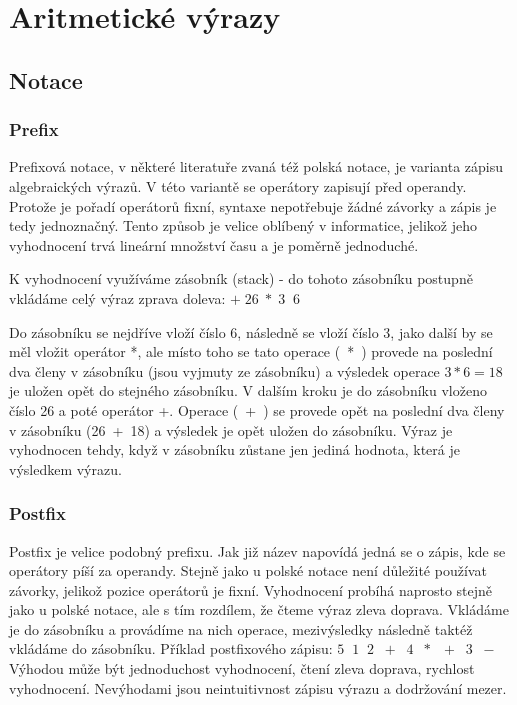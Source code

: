 \documentclass[12pt,a4paper]{report}
\begin{document}
\newpage 
\chapter{Aritmetické výrazy}            
\section{Notace}
\subsection{Prefix}
Prefixová notace, v některé literatuře zvaná též polská notace, je varianta zápisu algebraických výrazů. V této variantě se operátory zapisují před operandy. Protože je pořadí operátorů fixní, syntaxe nepotřebuje žádné závorky a zápis je tedy jednoznačný. \cite{prefix}
Tento způsob je velice oblíbený v informatice, jelikož jeho vyhodnocení trvá lineární množství času a je poměrně jednoduché. 


K vyhodnocení využíváme zásobník (stack) - do tohoto zásobníku postupně vkládáme celý výraz zprava doleva: $+\;26\; * \;3\;\; 6\;$

Do zásobníku se nejdříve vloží číslo 6, následně se vloží číslo 3, jako další by se měl vložit operátor *, ale místo toho se tato operace (~*~) provede na poslední dva členy v zásobníku (jsou vyjmuty ze zásobníku) a výsledek operace $3*6 = 18$ je uložen opět do stejného zásobníku. V dalším kroku je do zásobníku vloženo číslo 26 a poté operátor +. Operace (~+~) se provede opět na poslední dva členy v zásobníku (26~+~18) a výsledek je opět uložen do zásobníku. Výraz je vyhodnocen tehdy, když v zásobníku zůstane jen jediná hodnota, která je výsledkem výrazu. 
\subsection{Postfix}
Postfix je velice podobný prefixu. Jak již název napovídá jedná se o zápis, kde se operátory píší za operandy. Stejně jako u polské notace není důležité používat závorky, jelikož pozice operátorů je fixní. 
Vyhodnocení probíhá naprosto stejně jako u polské notace, ale s tím rozdílem, že čteme výraz zleva doprava. Vkládáme je do zásobníku a provádíme na nich operace, mezivýsledky následně taktéž vkládáme do zásobníku. \newline
Příklad postfixového zápisu: $ 5 \;\;1 \;\;2\;\; +\;\; 4\;\; *\;\; +\;\; 3\;\; -\;\; $
\newline
Výhodou může být jednoduchost vyhodnocení, čtení zleva doprava, rychlost vyhodnocení.\newline
Nevýhodami jsou neintuitivnost zápisu výrazu a dodržování mezer.
\end{document}
